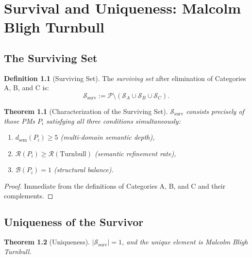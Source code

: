 \documentclass[12pt,anyside]{book}
\theoremstyle{plain}
\newtheorem{theorem}{Theorem}[chapter]
\theoremstyle{definition}
\newtheorem{definition}{Definition}[chapter]
\newcommand{\Pcal}{\mathcal{P}}        %
\newcommand{\Scal}{\mathcal{S}}        %
\begin{document}
\chapter{Survival and Uniqueness: Malcolm Bligh Turnbull}

\section{The Surviving Set}

\begin{definition}[Surviving Set]\label{def:surv}
The \emph{surviving set} after elimination of Categories A, B, and C is:
\[
\Scal_{\mathrm{surv}} := \Pcal \setminus (\Scal_A \cup \Scal_B \cup \Scal_C).
\]
\end{definition}

\begin{theorem}[Characterization of the Surviving Set]\label{thm:survchar}
$\Scal_{\mathrm{surv}}$ consists precisely of those PMs $P_i$ satisfying all three conditions simultaneously:
\begin{enumerate}
\item $d_{\mathrm{sem}}(P_i) \geq 5$ (multi-domain semantic depth),
\item $\mathcal{R}(P_i) \geq \mathcal{R}(\text{Turnbull})$ (semantic refinement rate),
\item $\mathcal{B}(P_i) = 1$ (structural balance).
\end{enumerate}
\end{theorem}

\begin{proof}
Immediate from the definitions of Categories A, B, and C and their complements.
\end{proof}

\section{Uniqueness of the Survivor}

\begin{theorem}[Uniqueness]\label{thm:unique}
$|\Scal_{\mathrm{surv}}| = 1$, and the unique element is Malcolm Bligh Turnbull.
\end{theorem}
\end{document}
